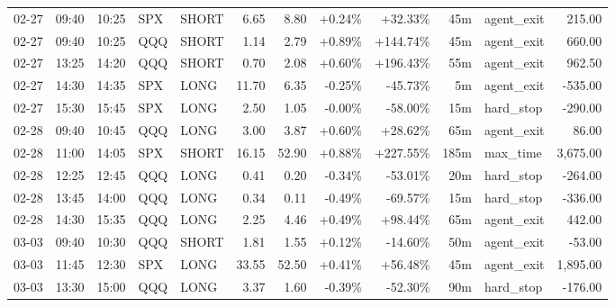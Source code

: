\documentclass[11pt,a4paper,twoside]{article}
\begin{document}
\begin{center}
\begin{longtable}{>{\color{txtmain}}l l l l l r r r r r >{\color{txtmain}}l r}
02-27 & 09:40 & 10:25 & SPX & SHORT & 6.65 & 8.80 & \textcolor{wingreen}{+0.24\%} & \textcolor{wingreen}{+32.33\%} & 45m & agent\_exit & \textcolor{wingreen}{215.00} \\
02-27 & 09:40 & 10:25 & QQQ & SHORT & 1.14 & 2.79 & \textcolor{wingreen}{+0.89\%} & \textcolor{wingreen}{+144.74\%} & 45m & agent\_exit & \textcolor{wingreen}{660.00} \\
02-27 & 13:25 & 14:20 & QQQ & SHORT & 0.70 & 2.08 & \textcolor{wingreen}{+0.60\%} & \textcolor{wingreen}{+196.43\%} & 55m & agent\_exit & \textcolor{wingreen}{962.50} \\
02-27 & 14:30 & 14:35 & SPX & LONG & 11.70 & 6.35 & \textcolor{lossred}{-0.25\%} & \textcolor{lossred}{-45.73\%} & 5m & agent\_exit & \textcolor{lossred}{-535.00} \\
02-27 & 15:30 & 15:45 & SPX & LONG & 2.50 & 1.05 & \textcolor{lossred}{-0.00\%} & \textcolor{lossred}{-58.00\%} & 15m & hard\_stop & \textcolor{lossred}{-290.00} \\
02-28 & 09:40 & 10:45 & QQQ & LONG & 3.00 & 3.87 & \textcolor{wingreen}{+0.60\%} & \textcolor{wingreen}{+28.62\%} & 65m & agent\_exit & \textcolor{wingreen}{86.00} \\
02-28 & 11:00 & 14:05 & SPX & SHORT & 16.15 & 52.90 & \textcolor{wingreen}{+0.88\%} & \textcolor{wingreen}{+227.55\%} & 185m & max\_time & \textcolor{wingreen}{3,675.00} \\
02-28 & 12:25 & 12:45 & QQQ & LONG & 0.41 & 0.20 & \textcolor{lossred}{-0.34\%} & \textcolor{lossred}{-53.01\%} & 20m & hard\_stop & \textcolor{lossred}{-264.00} \\
02-28 & 13:45 & 14:00 & QQQ & LONG & 0.34 & 0.11 & \textcolor{lossred}{-0.49\%} & \textcolor{lossred}{-69.57\%} & 15m & hard\_stop & \textcolor{lossred}{-336.00} \\
02-28 & 14:30 & 15:35 & QQQ & LONG & 2.25 & 4.46 & \textcolor{wingreen}{+0.49\%} & \textcolor{wingreen}{+98.44\%} & 65m & agent\_exit & \textcolor{wingreen}{442.00} \\
03-03 & 09:40 & 10:30 & QQQ & SHORT & 1.81 & 1.55 & \textcolor{wingreen}{+0.12\%} & \textcolor{lossred}{-14.60\%} & 50m & agent\_exit & \textcolor{lossred}{-53.00} \\
03-03 & 11:45 & 12:30 & SPX & LONG & 33.55 & 52.50 & \textcolor{wingreen}{+0.41\%} & \textcolor{wingreen}{+56.48\%} & 45m & agent\_exit & \textcolor{wingreen}{1,895.00} \\
03-03 & 13:30 & 15:00 & QQQ & LONG & 3.37 & 1.60 & \textcolor{lossred}{-0.39\%} & \textcolor{lossred}{-52.30\%} & 90m & hard\_stop & \textcolor{lossred}{-176.00} \\

\end{longtable}
\end{center}
\end{document}
